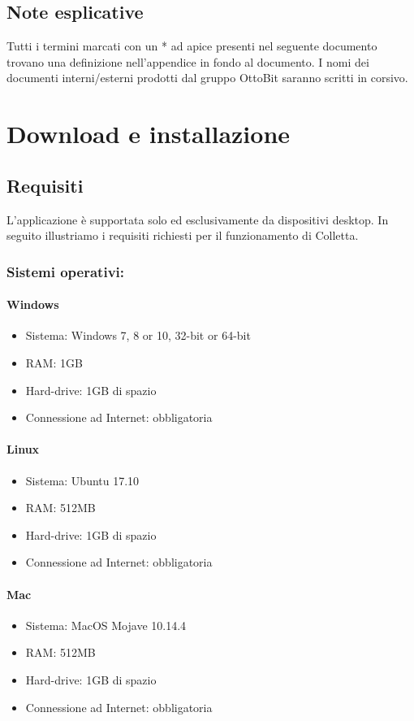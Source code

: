 \documentclass[11pt,a4paper]{article}
\begin{document}
{	\subsection{Note esplicative}
	Tutti i termini marcati con un * ad apice presenti nel seguente documento trovano una definizione
	nell'appendice in fondo al documento.
	I nomi dei documenti interni/esterni prodotti dal gruppo OttoBit saranno scritti in corsivo.
	\newpage
	\section{Download e installazione}
	\subsection{Requisiti}
	L'applicazione è supportata solo ed esclusivamente da dispositivi desktop. In seguito illustriamo i requisiti richiesti per il funzionamento di Colletta.
	\subsubsection{Sistemi operativi:} 
	\paragraph{Windows}
	\begin{itemize}
		\item Sistema: Windows 7, 8 or 10, 32-bit or 64-bit
		\item RAM: 1GB
		\item Hard-drive: 1GB di spazio
		\item Connessione ad Internet: obbligatoria
	\end{itemize}
	\paragraph{Linux}
	\begin{itemize}
		\item Sistema: Ubuntu 17.10
		\item RAM: 512MB
		\item Hard-drive: 1GB di spazio
		\item Connessione ad Internet: obbligatoria
	\end{itemize}
	\paragraph{Mac}
	\begin{itemize}
		\item Sistema: MacOS Mojave 10.14.4
		\item RAM: 512MB
		\item Hard-drive: 1GB di spazio
		\item Connessione ad Internet: obbligatoria
	\end{itemize}
}
\end{document}
